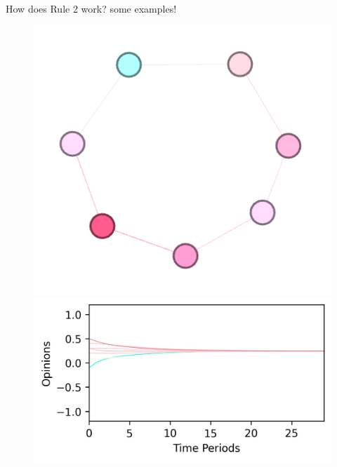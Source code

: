 \documentclass[xcolor=table,handout]{beamer}
\begin{document}
\begin{frame}{How does Rule 2 work? some examples! }
%
\begin{figure}
\centering
\begin{minipage}{.5\textwidth}
  \centering
  \includegraphics[scale = 0.55]{./img/cons_2.png}
\end{minipage}%
\begin{minipage}{.5\textwidth}
  \centering
  \includegraphics[scale = 0.55]{./img/plot_like_minded.jpg}
\end{minipage}
\end{figure}
\end{frame}
%
\end{document}
